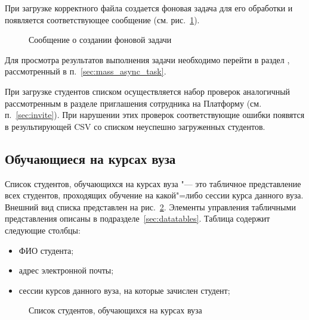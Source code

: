При загрузке корректного файла создается фоновая задача для его обработки и появляется соответствующее сообщение 
(см. рис.~\ref{img:student:invite_task_created}).

\begin{figure}[H]
	\caption{Сообщение о создании фоновой задачи}
	\label{img:student:invite_task_created}
\end{figure}

Для просмотра результатов выполнения задачи необходимо перейти в раздел , 
рассмотренный в п.~\ref{sec:mass_async_task}.

При загрузке студентов списком осуществляется набор проверок аналогичный рассмотренным в разделе 
приглашения сотрудника на Платформу  (см. п.~\ref{sec:invite}).
При нарушении этих проверок соответствующие ошибки появятся в результирующей CSV со списком неуспешно 
загруженных студентов.


\subsection{Обучающиеся на курсах вуза}
Список студентов, обучающихся на курсах вуза "--- это табличное представление всех студентов, 
проходящих обучение на какой"=либо сессии курса данного вуза.
Внешний вид списка представлен на рис.~\ref{img:student:enrolled_list}. 
Элементы управления табличными представления описаны в подразделе~\ref{sec:datatables}.
Таблица содержит следующие столбцы:
\begin{itemize}
	\item ФИО студента;
	\item адрес электронной почты;
	\item сессии курсов данного вуза, на которые зачислен студент;
\end{itemize}

\begin{figure}[H]
	\caption{Список студентов, обучающихся на курсах вуза}
	\label{img:student:enrolled_list}
\end{figure}

